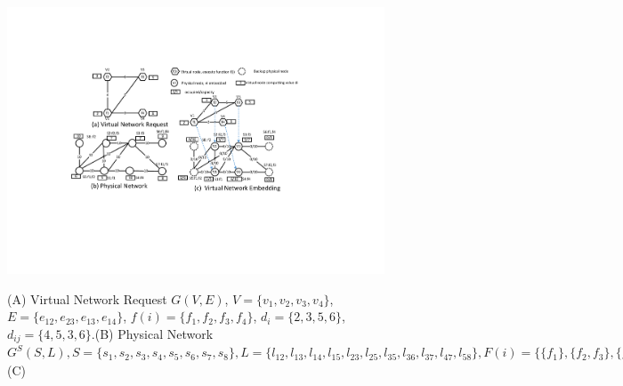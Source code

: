 \begin{figure}
\centering
\includegraphics[width=5in]{Fig/VNQSNVNE}\\
\caption{(A) Virtual Network Request $G(V,E)$, $V=\{v_1,v_2,v_3,v_4\}$, $E=\{e_{12},e_{23},e_{13},e_{14}\}$,  $f(i)=\{f_1,f_2,f_3,f_4\}$, $d_i=\{2,3,5,6\}$, $d_{ij}=\{4,5,3,6\}.$(B) Physical Network $G^S(S,L), S=\{s_1,s_2,s_3,s_4,s_5,s_6,s_7,s_8\}, L=\{l_{12},l_{13},l_{14},l_{15},l_{23},l_{25},l_{35},l_{36},l_{37},l_{47},l_{58}\}, F(i)=\{\{f_1\},\{f_2,f_3\},\{f_3\},\{f_4\},\{f_1,f_2\},\{f_1,f_4\},\{f_2,f_3\}\}, c_i=\{5,7,7,10,6,9,8,10\}, b_{ij}=\{10,10,10,10,10,10,10,10,10,10,10\}$ (C)}\label{fig:VNQSNVNE}
\end{figure}


